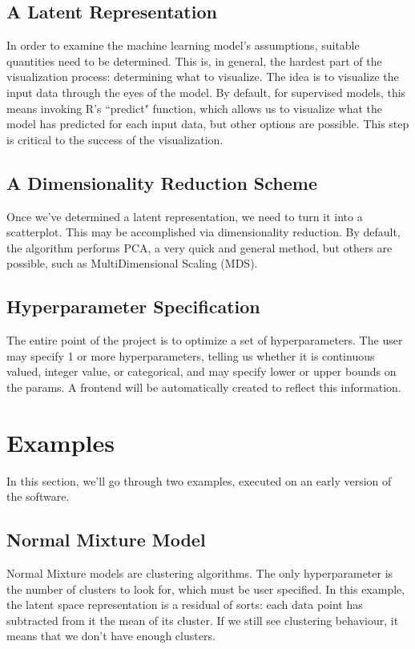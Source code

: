 \documentclass[a4paper]{article}
\begin{document}
\subsection{A Latent Representation}

In order to examine the machine learning model's assumptions, suitable quantities need to be determined. This is, in general, the hardest part of the visualization process: determining what to visualize. The idea is to visualize the input data through the eyes of the model. By default, for supervised models, this means invoking R's ``predict" function, which allows us to visualize what the model has predicted for each input data, but other options are possible. This step is critical to the success of the visualization.

\subsection{A Dimensionality Reduction Scheme}

Once we've determined a latent representation, we need to turn it into a scatterplot. This may be accomplished via dimensionality reduction. By default, the algorithm performs PCA, a very quick and general method, but others are possible, such as MultiDimensional Scaling (MDS).

\subsection{Hyperparameter Specification}

The entire point of the project is to optimize a set of hyperparameters. The user may specify 1 or more hyperparameters, telling us whether it is continuous valued, integer value, or categorical, and may specify lower or upper bounds on the params. A frontend will be automatically created to reflect this information.

\section{Examples}

In this section, we'll go through two examples, executed on an early version of the software.

\subsection{Normal Mixture Model}

Normal Mixture models are clustering algorithms. The only hyperparameter is the number of clusters to look for, which must be user specified. In this example, the latent space representation is a residual of sorts: each data point has subtracted from it the mean of its cluster. If we still see clustering behaviour, it means that we don't have enough clusters.
\end{document}
